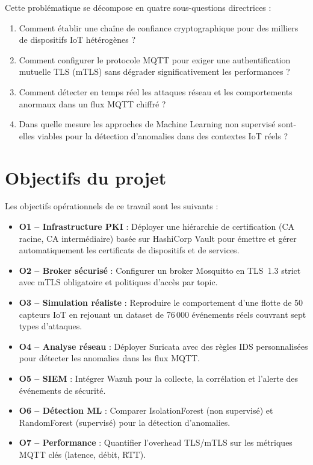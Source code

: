Cette problématique se décompose en quatre sous-questions directrices :

\begin{enumerate}
  \item Comment établir une chaîne de confiance cryptographique pour des milliers de dispositifs IoT hétérogènes ?
  \item Comment configurer le protocole MQTT pour exiger une authentification mutuelle TLS (mTLS) sans dégrader significativement les performances ?
  \item Comment détecter en temps réel les attaques réseau et les comportements anormaux dans un flux MQTT chiffré ?
  \item Dans quelle mesure les approches de Machine Learning non supervisé sont-elles viables pour la détection d'anomalies dans des contextes IoT réels ?
\end{enumerate}

\section{Objectifs du projet}

Les objectifs opérationnels de ce travail sont les suivants :

\begin{itemize}
  \item \textbf{O1 -- Infrastructure PKI} : Déployer une hiérarchie de certification (CA racine, CA intermédiaire) basée sur HashiCorp Vault pour émettre et gérer automatiquement les certificats de dispositifs et de services.
  \item \textbf{O2 -- Broker sécurisé} : Configurer un broker Mosquitto en TLS~1.3 strict avec mTLS obligatoire et politiques d'accès par topic.
  \item \textbf{O3 -- Simulation réaliste} : Reproduire le comportement d'une flotte de 50 capteurs IoT en rejouant un dataset de 76\,000 événements réels couvrant sept types d'attaques.
  \item \textbf{O4 -- Analyse réseau} : Déployer Suricata avec des règles IDS personnalisées pour détecter les anomalies dans les flux MQTT.
  \item \textbf{O5 -- SIEM} : Intégrer Wazuh pour la collecte, la corrélation et l'alerte des événements de sécurité.
  \item \textbf{O6 -- Détection ML} : Comparer IsolationForest (non supervisé) et RandomForest (supervisé) pour la détection d'anomalies.
  \item \textbf{O7 -- Performance} : Quantifier l'overhead TLS/mTLS sur les métriques MQTT clés (latence, débit, RTT).
\end{itemize}

